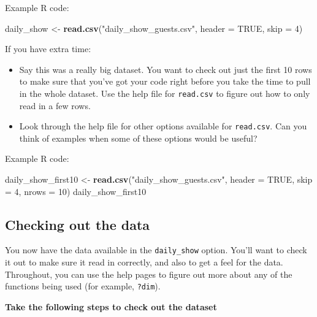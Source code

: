 \documentclass[]{book}
\makeatletter
\newenvironment{Shaded}{\begin{snugshade}}{\end{snugshade}}
\newcommand{\KeywordTok}[1]{\textcolor[rgb]{0.13,0.29,0.53}{\textbf{{#1}}}}
\newcommand{\DataTypeTok}[1]{\textcolor[rgb]{0.13,0.29,0.53}{{#1}}}
\newcommand{\DecValTok}[1]{\textcolor[rgb]{0.00,0.00,0.81}{{#1}}}
\newcommand{\StringTok}[1]{\textcolor[rgb]{0.31,0.60,0.02}{{#1}}}
\newcommand{\OtherTok}[1]{\textcolor[rgb]{0.56,0.35,0.01}{{#1}}}
\newcommand{\NormalTok}[1]{{#1}}
\providecommand{\tightlist}{%
  \setlength{\itemsep}{0pt}\setlength{\parskip}{0pt}}
\newenvironment{kframe}{%
\medskip{}
\setlength{\fboxsep}{.8em}
 \def\at@end@of@kframe{}%
 \ifinner\ifhmode%
  \def\at@end@of@kframe{\end{minipage}}%
  \begin{minipage}{\columnwidth}%
 \fi\fi%
 \def\FrameCommand##1{\hskip\@totalleftmargin \hskip-\fboxsep
 \colorbox{shadecolor}{##1}\hskip-\fboxsep
     \hskip-\linewidth \hskip-\@totalleftmargin \hskip\columnwidth}%
 \MakeFramed {\advance\hsize-\width
   \@totalleftmargin\z@ \linewidth\hsize
   \@setminipage}}%
 {\par\unskip\endMakeFramed%
 \at@end@of@kframe}
\renewenvironment{Shaded}{\begin{kframe}}{\end{kframe}}
\makeatother
\begin{document}
Example R code:

\begin{Shaded}
\begin{Highlighting}[]
\NormalTok{daily_show <-}\StringTok{ }\KeywordTok{read.csv}\NormalTok{(}\StringTok{"daily_show_guests.csv"}\NormalTok{, }\DataTypeTok{header =} \OtherTok{TRUE}\NormalTok{, }\DataTypeTok{skip =} \DecValTok{4}\NormalTok{)}
\end{Highlighting}
\end{Shaded}

If you have extra time:

\begin{itemize}
\tightlist
\item
  Say this was a really big dataset. You want to check out just the
  first 10 rows to make sure that you've got your code right before you
  take the time to pull in the whole dataset. Use the help file for
  \texttt{read.csv} to figure out how to only read in a few rows.
\item
  Look through the help file for other options available for
  \texttt{read.csv}. Can you think of examples when some of these
  options would be useful?
\end{itemize}

Example R code:

\begin{Shaded}
\begin{Highlighting}[]
\NormalTok{daily_show_first10 <-}\StringTok{ }\KeywordTok{read.csv}\NormalTok{(}\StringTok{"daily_show_guests.csv"}\NormalTok{, }\DataTypeTok{header =} \OtherTok{TRUE}\NormalTok{,}
                       \DataTypeTok{skip =} \DecValTok{4}\NormalTok{, }\DataTypeTok{nrows =} \DecValTok{10}\NormalTok{)}
\NormalTok{daily_show_first10}
\end{Highlighting}
\end{Shaded}

\subsection{Checking out the data}\label{checking-out-the-data}

You now have the data available in the \texttt{daily\_show} option.
You'll want to check it out to make sure it read in correctly, and also
to get a feel for the data. Throughout, you can use the help pages to
figure out more about any of the functions being used (for example,
\texttt{?dim}).

\textbf{Take the following steps to check out the dataset}
\end{document}
